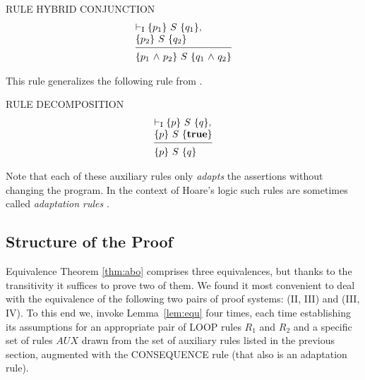 \documentclass[runningheads]{llncs}       %
\newcommand{\AUX}{\mathit{AUX}}
\begin{document}
\III

\noindent
RULE HYBRID CONJUNCTION
\[
 \begin{array}{l}
  \vdash_{\rm{I}} \HT{p_1}{S}{q_1},   \\
  \HT{p_2}{S}{q_2}                    \\
  [-\medskipamount]
  \hrulefill                          \\
  \HT{p_1 \A p_2}{S}{q_1 \A q_2}
 \end{array}
\]

This rule generalizes the following rule from \cite{ABO09}.
\III

\noindent
RULE DECOMPOSITION
\[
 \begin{array}{l}
  \vdash_{\rm{I}} \HT{p}{S}{q},      \\
  \HT{p}{S}{\T}                      \\
  [-\medskipamount]
  \hrulefill                         \\
  \HT{p}{S}{q}
  \end{array}
\]

\III




Note that each of these auxiliary rules only \emph{adapts} the assertions without changing the program.
In the context of Hoare's logic such rules are sometimes called \emph{adaptation rules}
\cite{Hoa71,Old83,GR16}.



\subsection{Structure of the Proof}
\label{subsec:structure}

Equivalence Theorem \ref{thm:abo} comprises three equivalences, but
thanks to the transitivity it suffices to prove two of them. We found
it most convenient to deal with the equivalence of the following two
pairs of proof systems: (II, III) and (III, IV). To this end we,
invoke Lemma~\ref{lem:equ} four times, each time establishing its
assumptions for an appropriate pair of LOOP rules $R_1$ and $R_2$ and
a specific set of rules $\AUX$ drawn from the set of auxiliary rules
listed in the previous section, augmented with the CONSEQUENCE rule
(that also is an adaptation rule).
\end{document}
